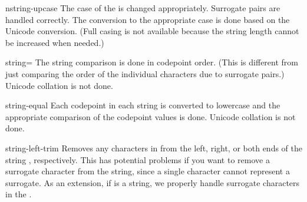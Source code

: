 \begin{defun}{}{nstring-upcase}{\args {} }
  The case of the  is changed appropriately.  Surrogate
  pairs are handled correctly.  The conversion to the appropriate case
  is done based on the Unicode conversion.  (Full casing is not
  available because the string length cannot be increased when needed.)
\end{defun}

\begin{defun}{}{string=}{\args {}  }
  The string comparison is done in codepoint order.  (This is
  different from just comparing the order of the individual characters
  due to surrogate pairs.)  Unicode collation is not done.
\end{defun}

\begin{defun}{}{string-equal}{\args {}  }
  Each codepoint in each string is converted to lowercase and the
  appropriate comparison of the codepoint values is done.  Unicode
  collation is not done.
\end{defun}

\begin{defun}{}{string-left-trim}{\args {} }
  Removes any characters in  from the left, right, or both
  ends of the string , respectively.  This has potential
  problems if you want to remove a surrogate character from the
  string, since a single character cannot represent a surrogate.  As
  an extension, if  is a string, we properly handle
  surrogate characters in the .
\end{defun}

